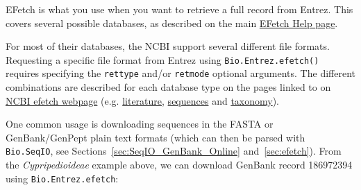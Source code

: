 \documentclass{report}
\begin{document}
EFetch is what you use when you want to retrieve a full record from Entrez.
This covers several possible databases, as described on the main \href{http://eutils.ncbi.nlm.nih.gov/entrez/query/static/efetch_help.html}{EFetch Help page}.

For most of their databases, the NCBI support several different file formats. Requesting a specific file format from Entrez using \verb|Bio.Entrez.efetch()| requires specifying the \verb|rettype| and/or \verb|retmode| optional arguments.  The different combinations are described for each database type on the pages linked to on \href{http://www.ncbi.nlm.nih.gov/entrez/query/static/efetch_help.html}{NCBI efetch webpage} (e.g. \href{http://eutils.ncbi.nlm.nih.gov/corehtml/query/static/efetchlit_help.html}{literature}, \href{http://eutils.ncbi.nlm.nih.gov/corehtml/query/static/efetchseq_help.html}{sequences} and \href{http://eutils.ncbi.nlm.nih.gov/corehtml/query/static/efetchtax_help.html}{taxonomy}).

One common usage is downloading sequences in the FASTA or GenBank/GenPept plain text formats (which can then be parsed with \verb|Bio.SeqIO|, see Sections~\ref{sec:SeqIO_GenBank_Online} and~\ref{sec:efetch}). From the \emph{Cypripedioideae} example above, we can download GenBank record 186972394 using \verb+Bio.Entrez.efetch+:
\end{document}

